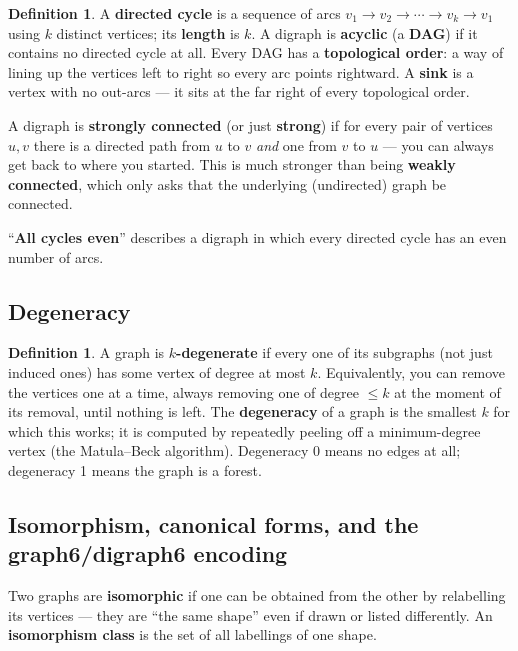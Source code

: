 \documentclass[11pt]{article}
\theoremstyle{plain}
\theoremstyle{definition}
\newtheorem{definition}[theorem]{Definition}
\theoremstyle{remark}
\begin{document}
\begin{definition}
A \textbf{directed cycle} is a sequence of arcs $v_1 \to v_2 \to \cdots \to v_k \to v_1$
using $k$ distinct vertices; its \textbf{length} is $k$. A digraph is \textbf{acyclic}
(a \textbf{DAG}) if it contains no directed cycle at all. Every DAG has a
\textbf{topological order}: a way of lining up the vertices left to right so every arc
points rightward. A \textbf{sink} is a vertex with no out-arcs — it sits at the far
right of every topological order.

A digraph is \textbf{strongly connected} (or just \textbf{strong}) if for every pair of
vertices $u, v$ there is a directed path from $u$ to $v$ \emph{and} one from $v$ to
$u$ — you can always get back to where you started. This is much stronger than being
\textbf{weakly connected}, which only asks that the underlying (undirected) graph be
connected.

``\textbf{All cycles even}'' describes a digraph in which every directed cycle has an
even number of arcs.
\end{definition}

\subsection{Degeneracy}

\begin{definition}
A graph is \textbf{$k$-degenerate} if every one of its subgraphs (not just induced
ones) has some vertex of degree at most $k$. Equivalently, you can remove the
vertices one at a time, always removing one of degree $\le k$ at the moment of its
removal, until nothing is left. The \textbf{degeneracy} of a graph is the smallest $k$
for which this works; it is computed by repeatedly peeling off a minimum-degree
vertex (the Matula--Beck algorithm). Degeneracy 0 means no edges at all; degeneracy 1
means the graph is a forest.
\end{definition}

\subsection{Isomorphism, canonical forms, and the graph6/digraph6 encoding}

Two graphs are \textbf{isomorphic} if one can be obtained from the other by
relabelling its vertices — they are ``the same shape'' even if drawn or listed
differently. An \textbf{isomorphism class} is the set of all labellings of one shape.
\end{document}
